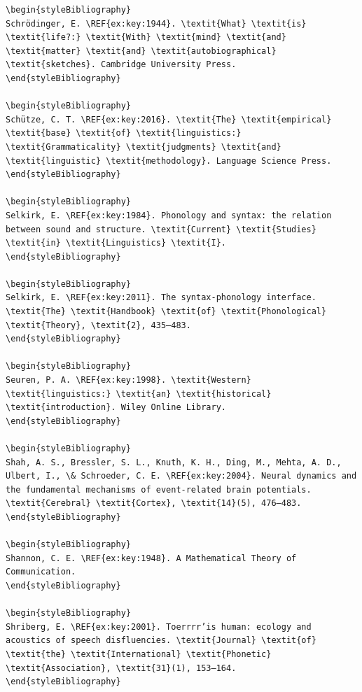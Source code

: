 \begin{verbatim}
\begin{styleBibliography}
Schrödinger, E. \REF{ex:key:1944}. \textit{What} \textit{is} \textit{life?:} \textit{With} \textit{mind} \textit{and} \textit{matter} \textit{and} \textit{autobiographical} \textit{sketches}. Cambridge University Press.
\end{styleBibliography}

\begin{styleBibliography}
Schütze, C. T. \REF{ex:key:2016}. \textit{The} \textit{empirical} \textit{base} \textit{of} \textit{linguistics:} \textit{Grammaticality} \textit{judgments} \textit{and} \textit{linguistic} \textit{methodology}. Language Science Press.
\end{styleBibliography}

\begin{styleBibliography}
Selkirk, E. \REF{ex:key:1984}. Phonology and syntax: the relation between sound and structure. \textit{Current} \textit{Studies} \textit{in} \textit{Linguistics} \textit{I}.
\end{styleBibliography}

\begin{styleBibliography}
Selkirk, E. \REF{ex:key:2011}. The syntax-phonology interface. \textit{The} \textit{Handbook} \textit{of} \textit{Phonological} \textit{Theory}, \textit{2}, 435–483.
\end{styleBibliography}

\begin{styleBibliography}
Seuren, P. A. \REF{ex:key:1998}. \textit{Western} \textit{linguistics:} \textit{an} \textit{historical} \textit{introduction}. Wiley Online Library.
\end{styleBibliography}

\begin{styleBibliography}
Shah, A. S., Bressler, S. L., Knuth, K. H., Ding, M., Mehta, A. D., Ulbert, I., \& Schroeder, C. E. \REF{ex:key:2004}. Neural dynamics and the fundamental mechanisms of event-related brain potentials. \textit{Cerebral} \textit{Cortex}, \textit{14}(5), 476–483.
\end{styleBibliography}

\begin{styleBibliography}
Shannon, C. E. \REF{ex:key:1948}. A Mathematical Theory of Communication.
\end{styleBibliography}

\begin{styleBibliography}
Shriberg, E. \REF{ex:key:2001}. Toerrrr’is human: ecology and acoustics of speech disfluencies. \textit{Journal} \textit{of} \textit{the} \textit{International} \textit{Phonetic} \textit{Association}, \textit{31}(1), 153–164.
\end{styleBibliography}


\end{verbatim}
